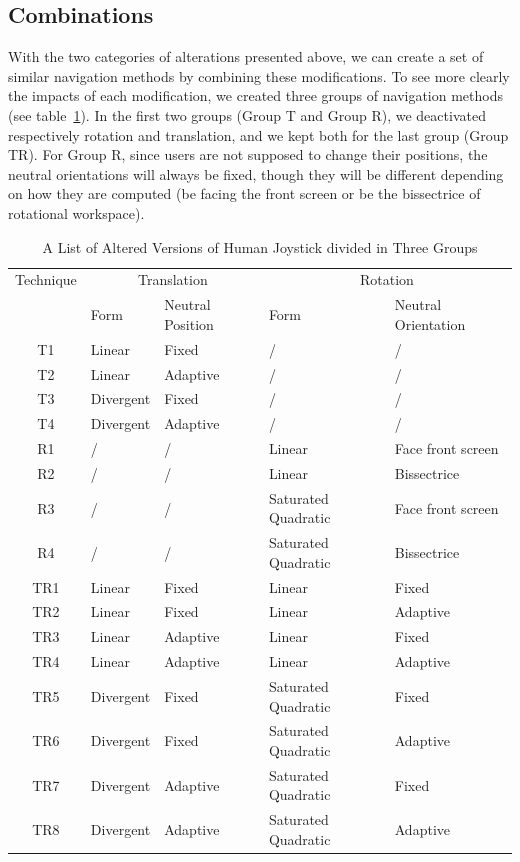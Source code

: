 \subsection{Combinations}
With the two categories of alterations presented above, we can create a set of similar navigation methods by combining these modifications. To see more clearly the impacts of each modification, we created three groups of navigation methods (see table~\ref{tab:4_combinations}). In the first two groups (Group T and Group R), we deactivated respectively rotation and translation, and we kept both for the last group (Group TR). For Group R, since users are not supposed to change their positions, the neutral orientations will always be fixed, though they will be different depending on how they are computed (be facing the front screen or be the bissectrice of rotational workspace).

\begin{table}[!t]
\renewcommand{\arraystretch}{1.3}
\caption{A List of Altered Versions of Human Joystick divided in Three Groups}
\label{tab:4_combinations}
\centering
\begin{tabular}{c l p{2.5cm} l p{2.5cm}}
  \hline
  Technique & \multicolumn{2}{c}{Translation} & \multicolumn{2}{c}{Rotation} \\
   & Form & Neutral Position & Form & Neutral Orientation \\ \hline
  T1 & Linear & Fixed & / & / \\
  T2 & Linear & Adaptive & / & / \\
  T3 & Divergent & Fixed & / & / \\
  T4 & Divergent & Adaptive & / & / \\ \hline
  R1 & / & / & Linear & Face front screen \\
  R2 & / & / & Linear & Bissectrice \\
  R3 & / & / & Saturated Quadratic & Face front screen \\
  R4 & / & / & Saturated Quadratic & Bissectrice \\ \hline
  TR1 & Linear & Fixed & Linear & Fixed \\ TR2 & Linear & Fixed & Linear & Adaptive \\
  TR3 & Linear & Adaptive & Linear & Fixed \\ TR4 & Linear & Adaptive & Linear & Adaptive \\
  TR5 & Divergent & Fixed & Saturated Quadratic & Fixed \\ TR6 & Divergent & Fixed & Saturated Quadratic & Adaptive \\
  TR7 & Divergent & Adaptive & Saturated Quadratic & Fixed \\ TR8 & Divergent & Adaptive & Saturated Quadratic & Adaptive \\
  \hline
\end{tabular}
\end{table}

